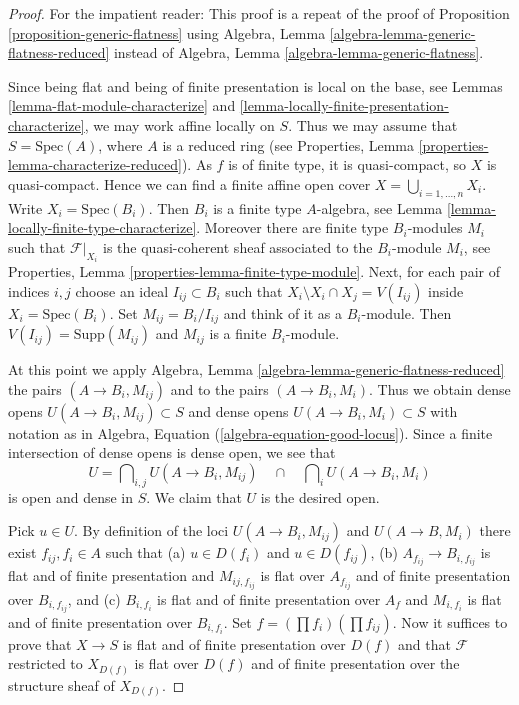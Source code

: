 \begin{proof}
For the impatient reader: This proof is a repeat of the proof of
Proposition \ref{proposition-generic-flatness}
using
Algebra, Lemma \ref{algebra-lemma-generic-flatness-reduced}
instead of
Algebra, Lemma \ref{algebra-lemma-generic-flatness}.

\medskip\noindent
Since being flat and being of finite presentation is local on the
base, see
Lemmas \ref{lemma-flat-module-characterize} and
\ref{lemma-locally-finite-presentation-characterize},
we may work affine locally on $S$. Thus we may assume that
$S = \text{Spec}(A)$, where $A$ is a reduced ring (see
Properties, Lemma \ref{properties-lemma-characterize-reduced}).
As $f$ is of finite type, it is quasi-compact, so $X$ is quasi-compact.
Hence we can find a finite affine open cover
$X = \bigcup_{i = 1, \ldots, n} X_i$. Write $X_i = \text{Spec}(B_i)$.
Then $B_i$ is a finite type $A$-algebra, see
Lemma \ref{lemma-locally-finite-type-characterize}.
Moreover there are finite type
$B_i$-modules $M_i$ such that $\mathcal{F}|_{X_i}$ is the
quasi-coherent sheaf associated to the $B_i$-module $M_i$, see
Properties, Lemma \ref{properties-lemma-finite-type-module}.
Next, for each pair of indices $i, j$ choose an ideal $I_{ij} \subset B_i$
such that $X_i \setminus X_i \cap X_j = V(I_{ij})$ inside
$X_i = \text{Spec}(B_i)$. Set $M_{ij} = B_i/I_{ij}$ and think
of it as a $B_i$-module. Then $V(I_{ij}) = \text{Supp}(M_{ij})$
and $M_{ij}$ is a finite $B_i$-module.

\medskip\noindent
At this point we apply
Algebra, Lemma \ref{algebra-lemma-generic-flatness-reduced}
the pairs $(A \to B_i, M_{ij})$ and to the pairs $(A \to B_i, M_i)$.
Thus we obtain dense opens
$U(A \to B_i, M_{ij}) \subset S$ and dense opens
$U(A \to B_i, M_i) \subset S$ with notation as in
Algebra, Equation (\ref{algebra-equation-good-locus}).
Since a finite intersection of dense opens is dense open, we see that
$$
U =
\bigcap\nolimits_{i, j} U(A \to B_i, M_{ij})
\quad\cap\quad
\bigcap\nolimits_i U(A \to B_i, M_i)
$$
is open and dense in $S$. We claim that $U$ is the desired open.

\medskip\noindent
Pick $u \in U$. By definition of the loci $U(A \to B_i, M_{ij})$
and $U(A \to B, M_i)$ there exist $f_{ij}, f_i \in A$ such that
(a) $u \in D(f_i)$ and $u \in D(f_{ij})$,
(b) $A_{f_{ij}} \to B_{i, f_{ij}}$ is flat and of finite presentation
and $M_{ij, f_{ij}}$ is flat over $A_{f_{ij}}$ and of finite presentation
over $B_{i, f_{ij}}$, and
(c) $B_{i, f_i}$ is flat and of finite presentation over $A_f$ and
$M_{i, f_i}$ is flat and of finite presentation over $B_{i, f_i}$. Set
$f = (\prod f_i) (\prod f_{ij})$.
Now it suffices to prove that $X \to S$ is flat and of finite presentation
over $D(f)$ and that $\mathcal{F}$ restricted to $X_{D(f)}$ is
flat over $D(f)$ and of finite presentation over the structure sheaf
of $X_{D(f)}$.


\end{proof}

